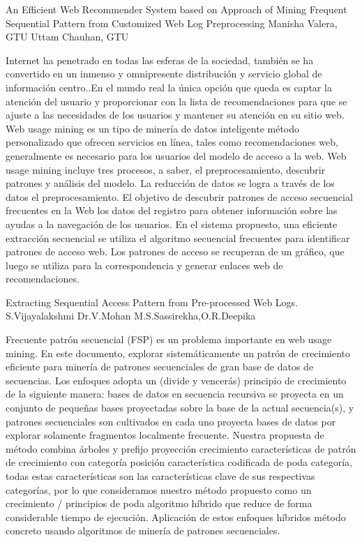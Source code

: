 An Efficient Web Recommender System based on Approach of Mining Frequent Sequential Pattern from Customized Web Log Preprocessing
Manisha Valera, GTU
Uttam Chauhan, GTU

Internet ha penetrado en todas las esferas de la sociedad, también se ha convertido en un inmenso y omnipresente distribución y servicio global de información centro..En el mundo real la única opción que queda es captar la atención del usuario y proporcionar con la lista de recomendaciones para que se ajuste a las necesidades de los usuarios y mantener su atención en su sitio web. Web usage mining es un tipo de minería de datos inteligente método personalizado que ofrecen servicios en línea, tales como recomendaciones web, generalmente es necesario para los usuarios del modelo de acceso a la web. Web usage mining incluye tres procesos, a saber, el preprocesamiento, descubrir patrones y análisis del modelo. La reducción de datos se logra a través de los datos el preprocesamiento. El objetivo de descubrir patrones de acceso secuencial frecuentes en la Web los datos del registro para obtener información sobre las ayudas a la navegación de los usuarios. En el sistema propuesto, una eficiente extracción secuencial se utiliza el algoritmo secuencial frecuentes para identificar patrones de acceso web. Los patrones de acceso se recuperan de un gráfico, que luego se utiliza para la correspondencia y generar enlaces web de recomendaciones.


Extracting Sequential Access Pattern from Pre-processed
Web Logs.
S.Vijayalakshmi
Dr.V.Mohan
M.S.Sassirekha,O.R.Deepika

Frecuente patrón secuencial (FSP) es un problema importante en web usage mining. En este documento, explorar sistemáticamente un patrón de crecimiento eficiente para minería de patrones secuenciales de gran base de datos de secuencias. Los enfoques adopta un (divide y vencerás) principio de crecimiento de la siguiente manera: bases de datos en secuencia recursiva se proyecta en un conjunto de pequeñas bases proyectadas sobre la base de la actual secuencia(s), y patrones secuenciales son cultivados en cada uno proyecta bases de datos por explorar solamente fragmentos localmente frecuente. Nuestra propuesta de método combina árboles y prefijo proyección crecimiento características de patrón de crecimiento con categoría posición característica codificada de poda categoría, todas estas características son las características clave de sus respectivas categorías, por lo que consideramos nuestro método propuesto como un crecimiento / principios de poda algoritmo híbrido que reduce de forma considerable tiempo de ejecución. Aplicación de estos enfoques híbridos método concreto usando algoritmos de minería de patrones secuenciales.



